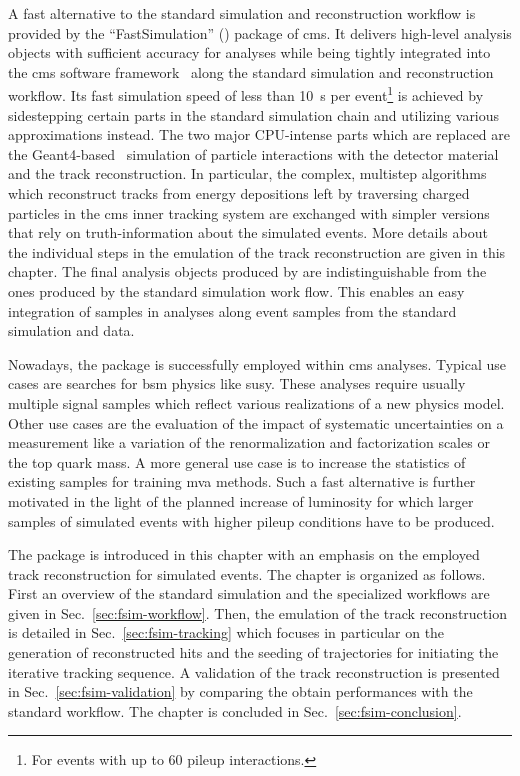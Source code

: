 A fast alternative to the standard simulation and reconstruction workflow is provided by the ``FastSimulation'' (\FSIM[format=hyperbf]) package of \gls{cms}. It delivers high-level analysis objects with sufficient accuracy for analyses while being tightly integrated into the \gls{cms} software framework~\cite{Bayatian:922757} along the standard simulation and reconstruction workflow. Its fast simulation speed of less than 10~s per event\footnote{For events with up to 60 pileup interactions.} is achieved by sidestepping certain parts in the standard simulation chain and utilizing various approximations instead. The two major CPU-intense parts which are replaced are the Geant4-based~\cite{Agostinelli2003250} simulation of particle interactions with the detector material and the track reconstruction. In particular, the complex, multistep algorithms which reconstruct tracks from energy depositions left by traversing charged particles in the \gls{cms} inner tracking system are exchanged with simpler versions that rely on truth-information about the simulated events. More details about the individual steps in the emulation of the track reconstruction are given in this chapter. The final analysis objects produced by \FSIM are indistinguishable from the ones produced by the standard simulation work flow. This enables an easy integration of \FSIM samples in analyses along event samples from the standard simulation and data.

Nowadays, the \FSIM package is successfully employed within \gls{cms} analyses. Typical use cases are searches for \acrfull{bsm} physics like \acrfull{susy}. These analyses require usually multiple signal samples which reflect various realizations of a new physics model. Other use cases are the evaluation of the impact of systematic uncertainties on a measurement like a variation of the renormalization and factorization scales or the top quark mass. A more general use case is to increase the statistics of existing samples for training \acrfull{mva} methods. Such a fast alternative is further motivated in the light of the planned increase of luminosity for which larger samples of simulated events with higher pileup conditions have to be produced.

The \FSIM package is introduced in this chapter with an emphasis on the employed track reconstruction for simulated events. The chapter is organized as follows. First an overview of the standard simulation and the specialized \FSIM workflows are given in Sec.~\ref{sec:fsim-workflow}. Then, the emulation of the track reconstruction is detailed in Sec.~\ref{sec:fsim-tracking} which focuses in particular on the generation of reconstructed hits and the seeding of trajectories for initiating the iterative tracking sequence. A validation of the track reconstruction is presented in Sec.~\ref{sec:fsim-validation} by comparing the obtain performances with the standard workflow. The chapter is concluded in Sec.~\ref{sec:fsim-conclusion}.



